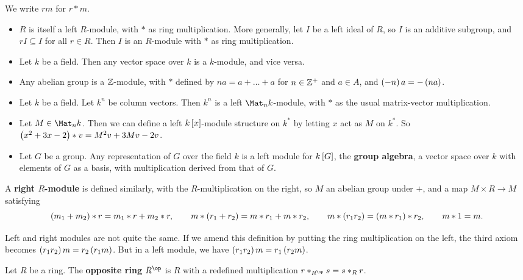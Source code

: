 We write $ rm $ for $ r * m $.

\begin{example*}
\hfill
\begin{itemize}
\item $ R $ is itself a left $ R $-module, with $ * $ as ring multiplication. More generally, let $ I $ be a left ideal of $ R $, so $ I $ is an additive subgroup, and $ rI \subseteq I $ for all $ r \in R $. Then $ I $ is an $ R $-module with $ * $ as ring multiplication.
\item Let $ k $ be a field. Then any vector space over $ k $ is a $ k $-module, and vice versa.
\item Any abelian group is a $ \mathbb{Z} $-module, with $ * $ defined by $ na = a + \dots + a $ for $ n \in \mathbb{Z}^+ $ and $ a \in A $, and $ \br{-n}a = -\br{na} $.
\item Let $ k $ be a field. Let $ k^n $ be column vectors. Then $ k^n $ is a left $ \Mat_n k $-module, with $ * $ as the usual matrix-vector multiplication.
\item Let $ M \in \Mat_n k $. Then we can define a left $ k\sbr{x} $-module structure on $ k^* $ by letting $ x $ act as $ M $ on $ k^* $. So $ \br{x^2 + 3x - 2} * v = M^2v + 3Mv - 2v $.
\item Let $ G $ be a group. Any representation of $ G $ over the field $ k $ is a left module for $ k\sbr{G} $, the \textbf{group algebra}, a vector space over $ k $ with elements of $ G $ as a basis, with multiplication derived from that of $ G $.
\end{itemize}
\end{example*}

\begin{definition}
A \textbf{right $ R $-module} is defined similarly, with the $ R $-multiplication on the right, so $ M $ an abelian group under $ + $, and a map $ M \times R \to M $ satisfying
$$ \br{m_1 + m_2} * r = m_1 * r + m_2 * r, \qquad m * \br{r_1 + r_2} = m * r_1 + m * r_2, \qquad m * \br{r_1r_2} = \br{m * r_1} * r_2, \qquad m * 1 = m. $$
\end{definition}

Left and right modules are not quite the same. If we amend this definition by putting the ring multiplication on the left, the third axiom becomes $ \br{r_1r_2}m = r_2\br{r_1m} $. But in a left module, we have $ \br{r_1r_2}m = r_1\br{r_2m} $.

\begin{definition}
Let $ R $ be a ring. The \textbf{opposite ring} $ R^{\op} $ is $ R $ with a redefined multiplication $ r *_{R^{\op}} s = s *_R r $.
\end{definition}

